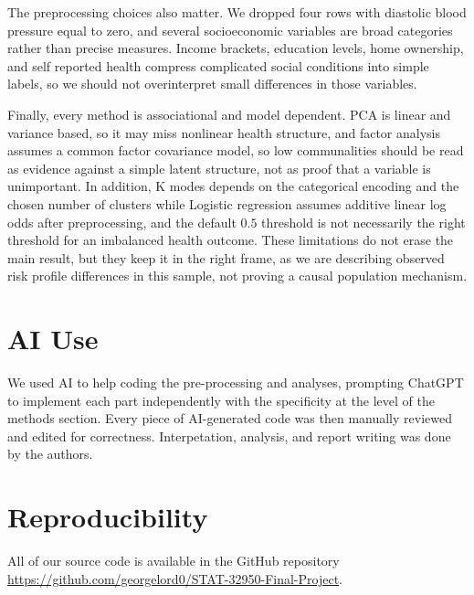 \documentclass[10pt]{article}
\begin{document}
The preprocessing choices also matter. We dropped four rows with diastolic blood pressure equal to zero, and several socioeconomic variables are broad categories rather than precise measures.
Income brackets, education levels, home ownership, and self reported health compress complicated social conditions into simple labels, so we should not overinterpret small differences in those variables.

Finally, every method is associational and model dependent. PCA is linear and variance based, so it may miss nonlinear health structure, and factor analysis assumes a common factor covariance model, so low communalities should be read as evidence against a simple latent structure, not as proof that a variable is unimportant.
In addition, K modes depends on the categorical encoding and the chosen number of clusters while Logistic regression assumes additive linear log odds after preprocessing, and the default $0.5$ threshold is not necessarily the right threshold for an imbalanced health outcome.
These limitations do not erase the main result, but they keep it in the right frame, as we are describing observed risk profile differences in this sample, not proving a causal population mechanism.

\section{AI Use}
We used AI to help coding the pre-processing and analyses, prompting ChatGPT to implement each part independently with the specificity at the level of the methods section. Every piece of AI-generated code was then manually reviewed and edited for correctness. Interpetation, analysis, and report writing was done by the authors.

\section{Reproducibility}

All of our source code is available in the GitHub repository \url{https://github.com/georgelord0/STAT-32950-Final-Project}.
\end{document}
